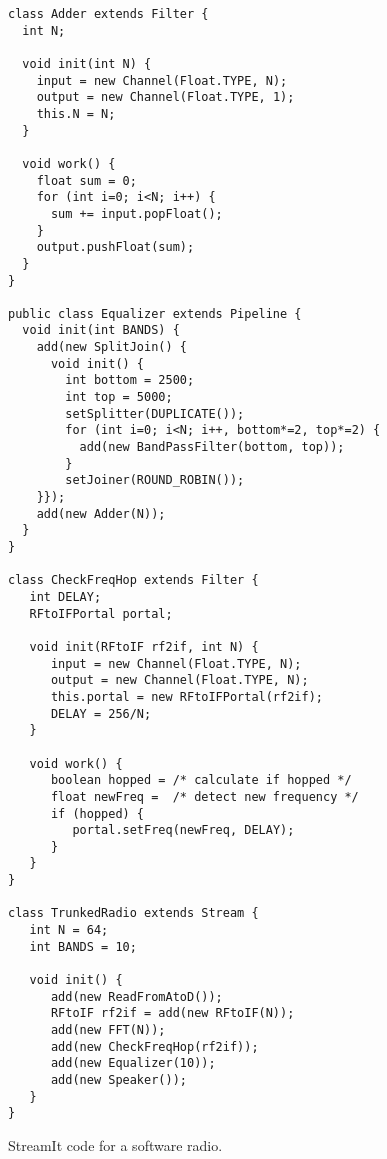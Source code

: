 \documentclass{sig-alternate}
\begin{document}
\begin{figure}
\vspace{-6pt}
\caption{Block diagram of a software radio.
\protect\label{fig:radiodiagram}}

\scriptsize
\begin{verbatim}
class Adder extends Filter {
  int N;

  void init(int N) {
    input = new Channel(Float.TYPE, N);
    output = new Channel(Float.TYPE, 1);
    this.N = N;
  }
  
  void work() {
    float sum = 0;
    for (int i=0; i<N; i++) {
      sum += input.popFloat();
    }
    output.pushFloat(sum);
  }
}

public class Equalizer extends Pipeline {
  void init(int BANDS) {
    add(new SplitJoin() {
      void init() {
        int bottom = 2500;
        int top = 5000;
        setSplitter(DUPLICATE());
        for (int i=0; i<N; i++, bottom*=2, top*=2) {
          add(new BandPassFilter(bottom, top));
        }
        setJoiner(ROUND_ROBIN());
    }});
    add(new Adder(N));
  }
}
  
class CheckFreqHop extends Filter {
   int DELAY;
   RFtoIFPortal portal;

   void init(RFtoIF rf2if, int N) {
      input = new Channel(Float.TYPE, N);
      output = new Channel(Float.TYPE, N);
      this.portal = new RFtoIFPortal(rf2if);
      DELAY = 256/N;
   }

   void work() {
      boolean hopped = /* calculate if hopped */
      float newFreq =  /* detect new frequency */
      if (hopped) {
         portal.setFreq(newFreq, DELAY);
      }
   }
}

class TrunkedRadio extends Stream {
   int N = 64;
   int BANDS = 10;

   void init() {
      add(new ReadFromAtoD());
      RFtoIF rf2if = add(new RFtoIF(N));
      add(new FFT(N));
      add(new CheckFreqHop(rf2if));
      add(new Equalizer(10));
      add(new Speaker());
   }
}
\end{verbatim}
\vspace{-16pt}
\caption{StreamIt code for a software radio.
\protect\label{fig:radiocode}}
\end{figure}


\begin{small}


\end{small}
\end{document}
